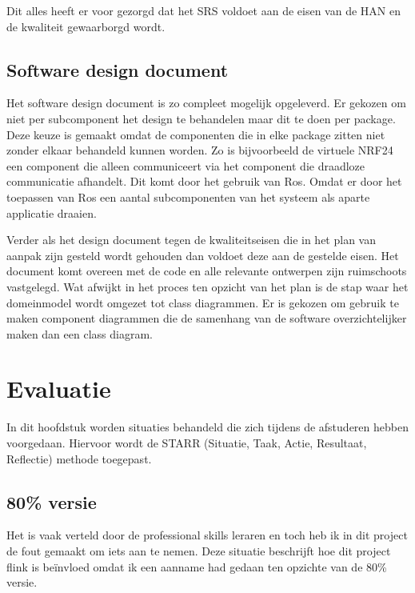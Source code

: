 \documentclass[a4paper, 11pt, oneside]{report}
\begin{document}
Dit alles heeft er voor gezorgd dat het SRS voldoet aan de eisen van de HAN en de kwaliteit gewaarborgd wordt.



\section{Software design document}\label{sec:software-design-document}
Het software design document is zo compleet mogelijk opgeleverd.
Er gekozen om niet per subcomponent het design te behandelen maar dit te doen per package.
Deze keuze is gemaakt omdat de componenten die in elke package zitten niet zonder elkaar behandeld kunnen worden.
Zo is bijvoorbeeld de virtuele NRF24 een component die alleen communiceert via het component die draadloze communicatie afhandelt.
Dit komt door het gebruik van Ros.
Omdat er door het toepassen van Ros een aantal subcomponenten van het systeem als aparte applicatie draaien.

Verder als het design document tegen de kwaliteitseisen die in het plan van aanpak zijn gesteld wordt gehouden dan voldoet deze aan de gestelde eisen.
Het document komt overeen met de code en alle relevante ontwerpen zijn ruimschoots vastgelegd.
Wat afwijkt in het proces ten opzicht van het plan is de stap waar het domeinmodel wordt omgezet tot class diagrammen. 
Er is gekozen om gebruik te maken component diagrammen die de samenhang van de software overzichtelijker maken dan een class diagram. 


\chapter{Evaluatie}\label{sec:evaluatie}
In dit hoofdstuk worden situaties behandeld die zich tijdens de afstuderen hebben voorgedaan. 
Hiervoor wordt de STARR (Situatie, Taak, Actie, Resultaat, Reflectie) methode toegepast. 

\section{80\% versie}\label{sec:altijd-navragen-nooit-aannemen}
Het is vaak verteld door de professional skills leraren en toch heb ik in dit project de fout gemaakt om iets aan te nemen.
Deze situatie beschrijft hoe dit project flink is beïnvloed omdat ik een aanname had gedaan ten opzichte van de 80\% versie.
\end{document}
